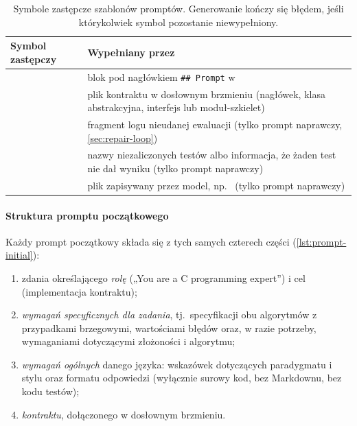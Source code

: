 \begin{table}[htbp]
  \centering
  \caption{Symbole zastępcze szablonów promptów. Generowanie kończy się błędem, jeśli którykolwiek
    symbol pozostanie niewypełniony.}
  \label{tab:placeholders}
  \small
  \begin{tabularx}{\textwidth}{@{}lY@{}}
    \toprule
    Symbol zastępczy & Wypełniany przez \\
    \midrule
          & blok pod nagłówkiem \texttt{\#\# Prompt} w  \\
                     & plik kontraktu w dosłownym brzmieniu (nagłówek, klasa abstrakcyjna, interfejs lub moduł-szkielet) \\
                      & fragment logu nieudanej ewaluacji (tylko prompt naprawczy, \cref{sec:repair-loop}) \\
               & nazwy niezaliczonych testów albo informacja, że żaden test nie dał wyniku (tylko prompt naprawczy) \\
                    & plik zapisywany przez model, np.\  (tylko prompt naprawczy) \\
    \bottomrule
  \end{tabularx}
\end{table}

\paragraph{Struktura promptu początkowego} Każdy prompt początkowy składa się z tych samych czterech
części (\cref{lst:prompt-initial}):
\begin{enumerate}
  \item zdania określającego \emph{rolę} („You are a C programming expert”) i cel (implementacja
    kontraktu);
  \item \emph{wymagań specyficznych dla zadania}, tj.\ specyfikacji obu algorytmów z przypadkami
    brzegowymi, wartościami błędów oraz, w razie potrzeby, wymaganiami dotyczącymi złożoności
    i algorytmu;
  \item \emph{wymagań ogólnych} danego języka: wskazówek dotyczących paradygmatu i stylu oraz
    formatu odpowiedzi (wyłącznie surowy kod, bez Markdownu, bez kodu testów);
  \item \emph{kontraktu}, dołączonego w dosłownym brzmieniu.
\end{enumerate}

